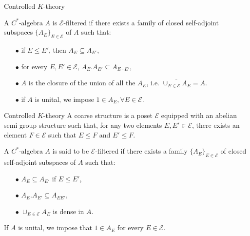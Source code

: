 \begin{frame}{Controlled $K$-theory}
\begin{definitionfr}
A $C^*$-algebra $A$ is $\mathcal E$-filtered if there exists a family of closed self-adjoint subspaces $\{A_E\}_{E\in\mathcal E}$ of $A$ such that:
\begin{itemize}
\item[$\bullet$] if $E\leq E'$, then $A_E\subseteq A_{E'}$,
\item[$\bullet$] for every $E,E'\in\mathcal E$, $A_E.A_{E'}\subseteq A_{E\circ E'}$,
\item[$\bullet$] $A$ is the closure of the union of all the $A_E$, i.e. $\overline{\cup_{E\in\mathcal E}A_E} = A$.
\item[$\bullet$] if $A$ is unital, we impose $1\in A_E,\forall E\in\mathcal E$.
\end{itemize}
\end{definitionfr}
\end{frame}

\begin{frame}{Controlled $K$-theory}	
A coarse structure is a poset $\mathcal E$ equipped with an abelian semi group structure such that, for any two elements $E,E'\in \mathcal E$, there exists an element $F\in \mathcal E$ such that $E\leq F$ and $E'\leq F$. \\

\begin{definition}
A $C^*$-algebra $A$ is said to be $\mathcal E$-filtered if there exists a family $\{A_E \}_{E\in \mathcal E}$ of closed self-adjoint subspaces of $A$ such that:
\begin{itemize}
\item[$\bullet$] $A_E \subseteq A_{E'}$ if $E\leq E'$,
\item[$\bullet$] $A_E . A_{E'} \subseteq A_{EE'}$,
\item[$\bullet$] $\cup_{E\in \mathcal E} A_E$ is dense in $A$.
\end{itemize} 
If $A$ is unital, we impose that $1\in A_E$ for every $E\in \mathcal E$.
\end{definition}
\end{frame}

